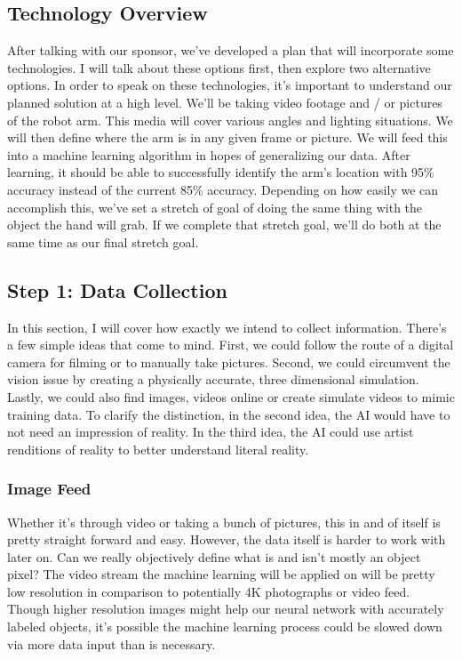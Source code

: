 \documentclass[10pt,journal,compsoc, draftclsnofoot,onecolumn]{IEEEtran}
\begin{document}
\subsection{Technology Overview}
After talking with our sponsor, we've developed a plan that will incorporate some technologies.
I will talk about these options first, then explore two alternative options.
In order to speak on these technologies, it's important to understand our planned solution at a high level.
We'll be taking video footage and / or pictures of the robot arm.
This media will cover various angles and lighting situations.
We will then define where the arm is in any given frame or picture.
We will feed this into a machine learning algorithm in hopes of generalizing our data.
After learning, it should be able to successfully identify the arm's location with 95\% accuracy instead of the current 85\% accuracy.
Depending on how easily we can accomplish this, we've set a stretch of goal of doing the same thing with the object the hand will grab.
If we complete that stretch goal, we'll do both at the same time as our final stretch goal.

\subsection{Step 1: Data Collection}
In this section, I will cover how exactly we intend to collect information.
There's a few simple ideas that come to mind.
First, we could follow the route of a digital camera for filming or to manually take pictures.
Second, we could circumvent the vision issue by creating a physically accurate, three dimensional simulation.
Lastly, we could also find images, videos online or create simulate videos to mimic training data.
To clarify the distinction, in the second idea, the AI would have to not need an impression of reality.
In the third idea, the AI could use artist renditions of reality to better understand literal reality.

\subsubsection{Image Feed}
Whether it's through video or taking a bunch of pictures, this in and of itself is pretty straight forward and easy.
However, the data itself is harder to work with later on. Can we really objectively define what is and isn't mostly an object pixel?
The video stream the machine learning will be applied on will be pretty low resolution in comparison to potentially 4K photographs or video feed.
Though higher resolution images might help our neural network with accurately labeled objects, it's possible the machine learning process could be slowed down via more data input than is necessary.
\end{document}
